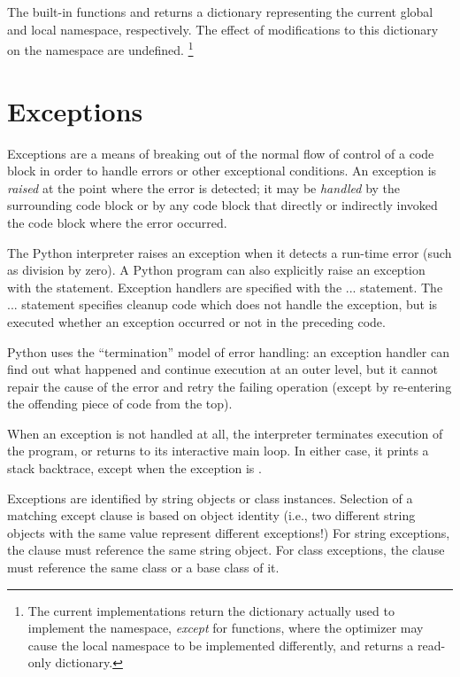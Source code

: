 The built-in functions  and  returns a
dictionary representing the current global and local namespace,
respectively.  The effect of modifications to this dictionary on the
namespace are undefined.%
\footnote{The current implementations return the dictionary actually 
used to implement the namespace, \emph{except} for functions, where
the optimizer may cause the local namespace to be implemented
differently, and  returns a read-only dictionary.}

\section{Exceptions\label{exceptions}}

Exceptions are a means of breaking out of the normal flow of control
of a code block in order to handle errors or other exceptional
conditions.  An exception is \emph{raised} at the point where the error
is detected; it may be \emph{handled} by the surrounding code block or
by any code block that directly or indirectly invoked the code block
where the error occurred.

The Python interpreter raises an exception when it detects a run-time
error (such as division by zero).  A Python program can also
explicitly raise an exception with the  statement.
Exception handlers are specified with the  ... 
statement.  The  ...  statement
specifies cleanup code which does not handle the exception, but is
executed whether an exception occurred or not in the preceding code.

Python uses the ``termination'' model of error handling: an exception
handler can find out what happened and continue execution at an outer
level, but it cannot repair the cause of the error and retry the
failing operation (except by re-entering the offending piece of
code from the top).

When an exception is not handled at all, the interpreter terminates
execution of the program, or returns to its interactive main loop.  In
either case, it prints a stack backtrace, except when the exception is 
.

Exceptions are identified by string objects or class instances.
Selection of a matching except clause is based on object identity
(i.e., two different string objects with the same value represent
different exceptions!)  For string exceptions, the 
clause must reference the same string object.  For class exceptions,
the  clause must reference the same class or a base
class of it.

